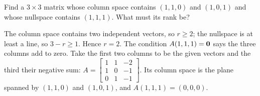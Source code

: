 \begin{exercise}\label{exr:u11-construct}
Find a $3\times3$ matrix whose column space contains $(1,1,0)$ and $(1,0,1)$ and whose nullspace
contains $(1,1,1)$. What must its rank be?
\end{exercise}
\begin{solution}
The column space contains two independent vectors, so $r\ge2$; the nullspace is at least a line,
so $3-r\ge1$. Hence $r=2$. The condition $A(1,1,1)=\boldsymbol{0}$ says the three columns add to zero. Take
the first two columns to be the given vectors and the third their negative sum:
$A=\begin{bmatrix}1&1&-2\\1&0&-1\\0&1&-1\end{bmatrix}$. Its column space is the plane spanned by
$(1,1,0)$ and $(1,0,1)$, and $A(1,1,1)=(0,0,0)$.
\end{solution}
